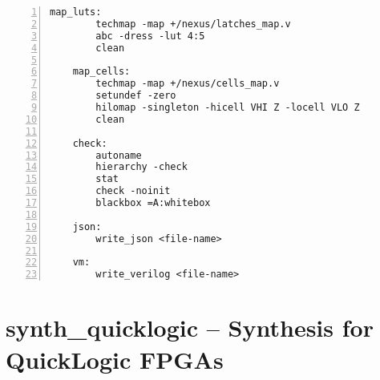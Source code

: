 \begin{lstlisting}[numbers=left,frame=single]
    map_luts:
        techmap -map +/nexus/latches_map.v
        abc -dress -lut 4:5
        clean

    map_cells:
        techmap -map +/nexus/cells_map.v
        setundef -zero
        hilomap -singleton -hicell VHI Z -locell VLO Z
        clean

    check:
        autoname
        hierarchy -check
        stat
        check -noinit
        blackbox =A:whitebox

    json:
        write_json <file-name>

    vm:
        write_verilog <file-name>
\end{lstlisting}

\section{synth\_quicklogic -- Synthesis for QuickLogic FPGAs}
\label{cmd:synth_quicklogic}
